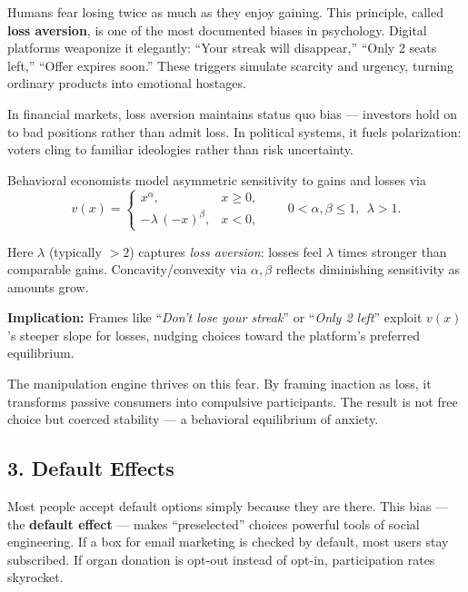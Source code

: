 \documentclass[12pt,twoside]{book}
\begin{document}
Humans fear losing twice as much as they enjoy gaining.  
This principle, called \textbf{loss aversion}, is one of the most documented biases in psychology.  
Digital platforms weaponize it elegantly: ``Your streak will disappear,'' ``Only 2 seats left,'' ``Offer expires soon.''  
These triggers simulate scarcity and urgency, turning ordinary products into emotional hostages.  

In financial markets, loss aversion maintains status quo bias --- investors hold on to bad positions rather than admit loss.  
In political systems, it fuels polarization: voters cling to familiar ideologies rather than risk uncertainty.

\begin{tcolorbox}[colback=gray!5,colframe=gray!60,boxrule=0.4pt,arc=1mm,
title=Mathematical Interlude: Prospect Theory’s Value Function]

Behavioral economists model asymmetric sensitivity to gains and losses via
\[
v(x)=
\begin{cases}
x^{\alpha}, & x \ge 0,\\[4pt]
-\lambda\,(-x)^{\beta}, & x<0,
\end{cases}
\qquad 0<\alpha,\beta\le 1,\ \ \lambda>1.
\]

Here $\lambda$ (typically $>2$) captures \emph{loss aversion}: losses feel $\lambda$ times stronger than comparable gains.  
Concavity/convexity via $\alpha,\beta$ reflects diminishing sensitivity as amounts grow.

\medskip
\textbf{Implication:} Frames like “\emph{Don’t lose your streak}” or “\emph{Only 2 left}” exploit $v(x)$’s steeper slope for losses, nudging choices toward the platform’s preferred equilibrium.
\end{tcolorbox}

The manipulation engine thrives on this fear.  
By framing inaction as loss, it transforms passive consumers into compulsive participants.  
The result is not free choice but coerced stability --- a behavioral equilibrium of anxiety.

\subsection*{3. Default Effects}

Most people accept default options simply because they are there.  
This bias --- the \textbf{default effect} --- makes ``preselected'' choices powerful tools of social engineering.  
If a box for email marketing is checked by default, most users stay subscribed.  
If organ donation is opt-out instead of opt-in, participation rates skyrocket.  
\end{document}
